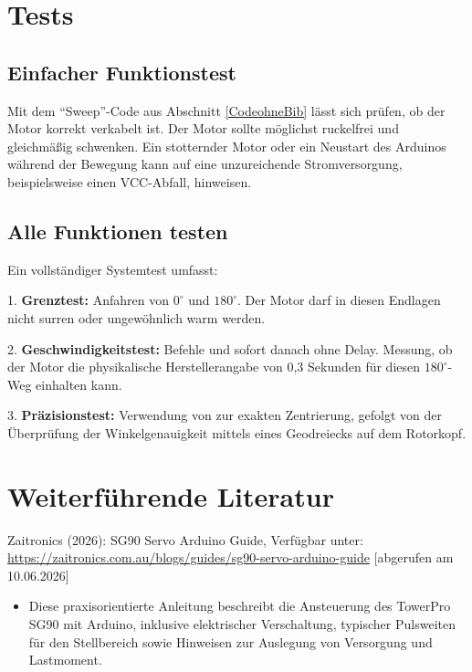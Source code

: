 \section{Tests}

\subsection{Einfacher Funktionstest}
Mit dem "`Sweep"'-Code aus Abschnitt \ref{CodeohneBib} lässt sich prüfen, ob der Motor korrekt verkabelt ist. Der Motor sollte möglichst ruckelfrei und gleichmä\ss ig schwenken. Ein stotternder Motor oder ein Neustart des Arduinos während der Bewegung kann auf eine unzureichende Stromversorgung, beispielsweise einen VCC-Abfall, hinweisen.

\subsection{Alle Funktionen testen}
Ein vollständiger Systemtest umfasst:


1. \textbf{Grenztest:} Anfahren von $0^\circ$ und $180^\circ$. Der Motor darf in diesen Endlagen nicht surren oder ungewöhnlich warm werden.\cite{ArduinoWriteMic:2026}

2. \textbf{Geschwindigkeitstest:} Befehle  und sofort danach  ohne Delay. Messung, ob der Motor die physikalische Herstellerangabe von 0,3 Sekunden für diesen $180^\circ$-Weg einhalten kann.\cite{Components101:2017}

3. \textbf{Präzisionstest:} Verwendung von  zur exakten Zentrierung, gefolgt von der Überprüfung der Winkelgenauigkeit mittels eines Geodreiecks auf dem Rotorkopf.\cite{ArduinoWriteMic:2026}

\section{Weiterführende Literatur}

Zaitronics (2026): SG90 Servo Arduino Guide, Verfügbar unter: \url{https://zaitronics.com.au/blogs/guides/sg90-servo-arduino-guide} [abgerufen am 10.06.2026]

\begin{itemize}
	\item Diese praxisorientierte Anleitung beschreibt die Ansteuerung des TowerPro SG90 mit Arduino, inklusive elektrischer Verschaltung, typischer Pulsweiten für den Stellbereich sowie Hinweisen zur Auslegung von Versorgung und Lastmoment.
\end{itemize}

